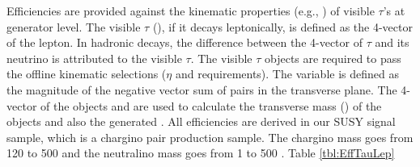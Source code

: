 Efficiencies are provided against the kinematic properties (e.g., \pt) of visible $\tau$'s at generator level. The visible $\tau$ (\visTau), if it decays leptonically, is defined as the 4-vector of the lepton. In hadronic decays, the difference between the 4-vector of $\tau$ and its neutrino is attributed to the visible $\tau$. %
The visible $\tau$ objects are required to pass the offline kinematic selections ($\eta$ and \pt requirements). The \genMET variable is defined as the magnitude of the negative vector sum of \visTau pairs in the transverse plane. The 4-vector of the \visTau objects and \genMET are used to calculate the transverse mass (\mt) of the \visTau objects and also the generated \mttwo. All efficiencies are derived in our SUSY signal sample, which is a chargino pair production sample. The chargino mass goes from 120 to 500 \GeV and the neutralino mass goes from 1 to 500 \GeV. 
Table \ref{tbl:EffTauLep}
